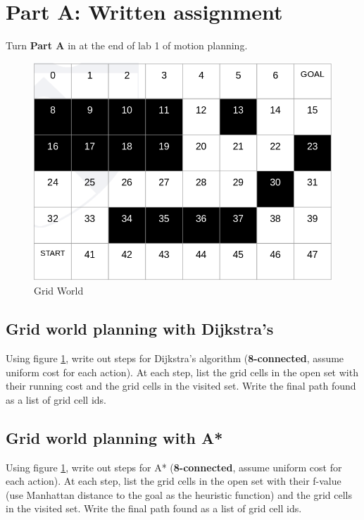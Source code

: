 \documentclass[letter]{article}
\begin{document}
\newpage
\section{Part A: Written assignment}
Turn \textbf{Part A} in at the end of lab 1 of motion planning.
\begin{figure}[!hb]
    \begin{center}
    \includegraphics[scale=0.4]{grid_world.png}
    \end{center}
    \caption{Grid World}
    \label{fig:gridworld}
\end{figure}
\subsection{Grid world planning with Dijkstra's}
Using figure \ref{fig:gridworld}, write out steps for Dijkstra's algorithm (\textbf{8-connected}, assume uniform cost for each action). At each step, list the grid cells in the open set with their running cost and the grid cells in the visited set. Write the final path found as a list of grid cell ids.\\
\newpage
\subsection{Grid world planning with A*}
Using figure \ref{fig:gridworld}, write out steps for A* (\textbf{8-connected}, assume uniform cost for each action). At each step, list the grid cells in the open set with their f-value (use Manhattan distance to the goal as the heuristic function) and the grid cells in the visited set. Write the final path found as a list of grid cell ids.\\
\end{document}
